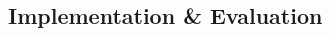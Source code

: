 \documentclass{article}
\begin{document}
\subsection {Implementation \& Evaluation} %
\begin{thebibliography}{9}

\end{thebibliography}
\end{document}
